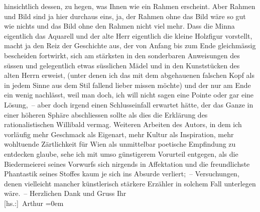 \begin{ledgroupsized}[t]{13cm}
               hinsichtlich dessen, zu hegen, was Ihnen wie ein Rahmen erscheint. Aber Rahmen und
               Bild sind ja hier durchaus eins, ja, der Rahmen ohne das Bild wäre so gut wie nichts
               und das Bild ohne den Rahmen nicht viel mehr. Dass die Minna eigentlich das Aquarell und der alte
               Herr eigentlich die kleine Holzfigur vorstellt, macht ja den Reiz der Geschichte aus,
               der von Anfang bis zum Ende gleichmässig bescheiden fortwirkt, sich am stärksten in
               den sonderbaren Anweisungen des süssen und gelegentlich etwas süsslichen Mädel und in
               den Kunststücken des alten {\pb}Herrn erweist, (unter denen ich
               das mit dem abgehauenen falschen Kopf als in jedem Sinne aus dem Stil fallend lieber
               missen möchte) und der nur am Ende ein wenig nachlässt, weil man doch, ich will nicht
               sagen eine Pointe oder gar eine Lösung, – aber doch irgend einen Schlusseinfall
               erwartet hätte, der das Ganze in einer höheren Sphäre abschliessen sollte als dies
               die Erklärung des rationalistischen Willibald vermag. Weiteren Arbeiten des Autors, in dem ich vorläufig mehr Geschmack als Eigenart,
               mehr Kultur als Inspiration, mehr wohltuende Zärtlichkeit für Wien als unmittelbar poetische Empfindung zu entdecken glaube,
               sehe ich mit umso günstigerem Vorurteil entgegen, als die Biedermeierei seines
               Vorwurfs \introOben{}sich\introOben{} nirgends in Affektation und die freundlichste
               Phantastik seines Stoffes kaum je sich ins Absurde verliert; – Versuchungen, denen
               vielleicht mancher künstlerisch stärkere Erzähler in solchem Fall unterlegen wäre. –
               Herzlichen Dank und Gruss\pend
           \pstart
           Ihr{\\[\baselineskip]}\spacefill\mbox{{[}hs.:{]} Arthur}\pend
           \leftskip=0em{}
         
         \endnumbering{}\end{ledgroupsized}  \newcommand{\dateiname}{L02238}\newcommand{\titel}{Arthur Schnitzler an Hugo von Hofmannsthal, 22. 8. 1916}\newcommand{\editorInnen}{Martin Anton Müller und Gerd-Hermann Susen}
      
